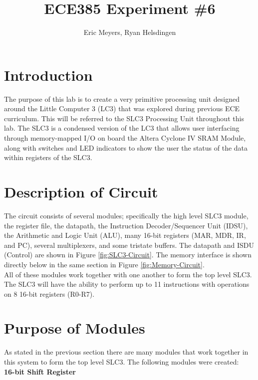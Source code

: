 \documentclass[journal, twocolumn, final,11pt,letterpaper]{IEEEtran}
\title{ECE385 Experiment \#6
	}
\author{
{Eric Meyers, Ryan Helsdingen}\\
\IEEEauthorblockA{Section ABG; TAs: Ben Delay, Shuo Liu \\
March 9th, 2016 \\
emeyer7, helsdin2}}
\begin{document}
	
\maketitle
\singlespacing

\section{Introduction}
The purpose of this lab is to create a very primitive processing unit designed around the Little Computer 3 (LC3) that was explored during previous ECE curriculum. This will be referred to the SLC3 Processing Unit throughout this lab. The SLC3 is a condensed version of the LC3 that allows user interfacing through memory-mapped I/O on board the Altera Cyclone IV SRAM Module, along with switches and LED indicators to show the user the status of the data within registers of the SLC3.  

\section{Description of Circuit}
The circuit consists of several modules; specifically the high level SLC­3 module, the register file, the datapath, the Instruction Decoder/Sequencer Unit (IDSU), the Arithmetic and Logic Unit (ALU), many 16-bit registers (MAR, MDR, IR, and PC), several multiplexers, and some tristate buffers. The datapath and ISDU (Control) are shown in Figure \ref{fig:SLC3-Circuit}. The memory interface is shown directly below in the same section in Figure \ref{fig:Memory-Circuit}.\\

All of these modules work together with one another to form the top level SLC3. The SLC3 will have the ability to perform up to 11 instructions with operations on 8 16-bit registers (R0-R7). \\

\section{Purpose of Modules}
As stated in the previous section there are many modules that work together in this system to form the top level SLC3. The following modules were created:\\

\normalsize\textbf{16-bit Shift Register} \\
\end{document}
